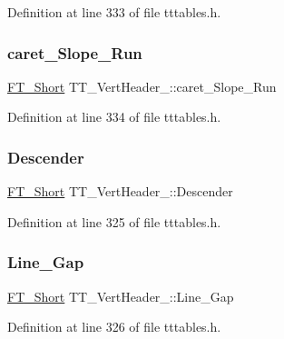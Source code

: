 Definition at line 333 of file tttables.\+h.

\mbox{\label{struct_t_t___vert_header___a98ff91b532d827440f7140d3071d473d}} 
\subsubsection{\texorpdfstring{caret\_Slope\_Run}{caret\_Slope\_Run}}
{\footnotesize\ttfamily \mbox{\hyperlink{fttypes_8h_aa7279be89046a2563cd3d4d6651fbdcf}{F\+T\+\_\+\+Short}} T\+T\+\_\+\+Vert\+Header\+\_\+\+::caret\+\_\+\+Slope\+\_\+\+Run}



Definition at line 334 of file tttables.\+h.

\mbox{\label{struct_t_t___vert_header___afeeb8f6c759a76d655f24f1d58f1cf35}} 
\subsubsection{\texorpdfstring{Descender}{Descender}}
{\footnotesize\ttfamily \mbox{\hyperlink{fttypes_8h_aa7279be89046a2563cd3d4d6651fbdcf}{F\+T\+\_\+\+Short}} T\+T\+\_\+\+Vert\+Header\+\_\+\+::\+Descender}



Definition at line 325 of file tttables.\+h.

\mbox{\label{struct_t_t___vert_header___a8a6ad9f251e12e6701ebe53d19a65aa5}} 
\subsubsection{\texorpdfstring{Line\_Gap}{Line\_Gap}}
{\footnotesize\ttfamily \mbox{\hyperlink{fttypes_8h_aa7279be89046a2563cd3d4d6651fbdcf}{F\+T\+\_\+\+Short}} T\+T\+\_\+\+Vert\+Header\+\_\+\+::\+Line\+\_\+\+Gap}



Definition at line 326 of file tttables.\+h.

